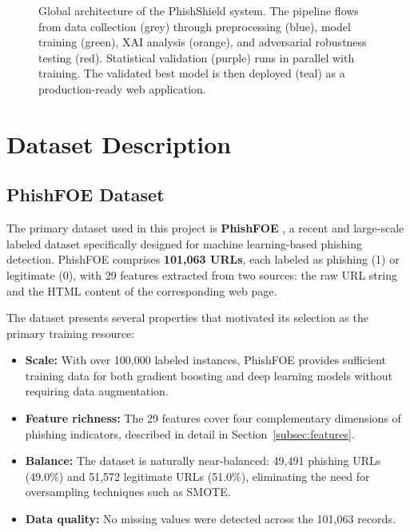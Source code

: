 \begin{figure}[H]
\begin{tikzpicture}
\end{tikzpicture}
\caption{Global architecture of the PhishShield system. The pipeline flows from data collection (grey) through preprocessing (blue), model training (green), XAI analysis (orange), and adversarial robustness testing (red). Statistical validation (purple) runs in parallel with training. The validated best model is then deployed (teal) as a production-ready web application.}
\label{fig:pipeline}
\end{figure}

\section{Dataset Description}

\subsection{PhishFOE Dataset}

The primary dataset used in this project is \textbf{PhishFOE} \cite{phishfoe}, a recent and large-scale labeled dataset specifically designed for machine learning-based phishing detection. PhishFOE comprises \textbf{101,063 URLs}, each labeled as phishing (1) or legitimate (0), with 29 features extracted from two sources: the raw URL string and the HTML content of the corresponding web page.

The dataset presents several properties that motivated its selection as the primary training resource:

\begin{itemize}
    \item \textbf{Scale:} With over 100,000 labeled instances, PhishFOE provides sufficient training data for both gradient boosting and deep learning models without requiring data augmentation.
    \item \textbf{Feature richness:} The 29 features cover four complementary dimensions of phishing indicators, described in detail in Section~\ref{subsec:features}.
    \item \textbf{Balance:} The dataset is naturally near-balanced: 49,491 phishing URLs (49.0\%) and 51,572 legitimate URLs (51.0\%), eliminating the need for oversampling techniques such as SMOTE.
    \item \textbf{Data quality:} No missing values were detected across the 101,063 records.
\end{itemize}

